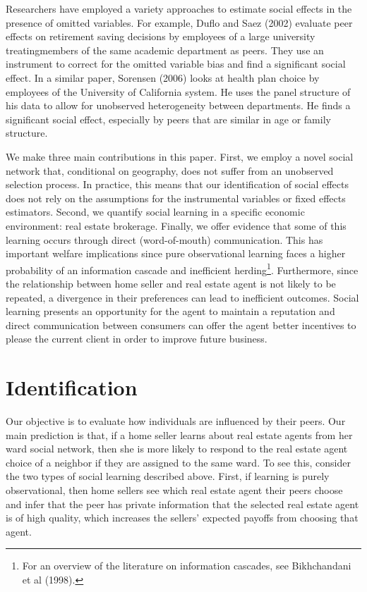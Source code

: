 \documentclass[12pt]{article}
\begin{document}
    Researchers have employed a variety approaches to estimate social effects in the presence of omitted variables. For example, Duflo and Saez (2002)
    evaluate peer effects on retirement saving decisions by employees of a large university treatingmembers of the same academic department as peers.
    They use an instrument to correct for the omitted variable bias and find a significant social effect. In a similar paper, Sorensen (2006) looks at
    health plan choice by employees of the University of California system. He uses the panel structure of his data to allow for unobserved
    heterogeneity between departments. He finds a significant social effect, especially by peers that are similar in age or family structure. 

    We make three main contributions in this paper. First, we employ a novel social network that, conditional on geography, does not suffer from
    an unobserved selection process. In practice, this means that our identification of social effects does not rely on the assumptions for the
    instrumental variables or fixed effects estimators. Second, we quantify social learning in a specific economic environment: real estate brokerage.
    Finally, we offer evidence that some of this learning occurs through direct (word-of-mouth) communication. This has important
    welfare implications since pure observational learning faces a higher probability of an information cascade and inefficient
    herding\footnote{For an overview of the literature on information cascades, see Bikhchandani et al (1998).}.
    Furthermore, since the relationship between home seller and real estate agent is not likely to be repeated, a divergence in their preferences can
    lead to inefficient outcomes. Social learning presents an opportunity for the agent to maintain a reputation and direct communication between
    consumers can offer the agent better incentives to please the current client in
    order to improve future business.

\section*{Identification}
    Our objective is to evaluate how individuals are influenced by their peers. Our main prediction is that, if a home seller learns about real estate
    agents from her ward social network, then she is more likely to respond to the real estate agent choice of a neighbor if they are assigned to the
    same ward. To see this, consider the two types of social learning described above. First, if learning is purely observational, then home sellers
    see which real estate agent their peers choose and infer that the peer has private information that the selected real estate agent is of high
    quality, which increases the sellers' expected payoffs from choosing that agent.  
\end{document}
